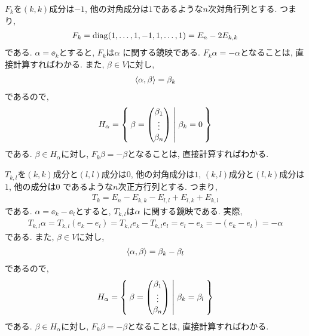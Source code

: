 \begin{example}
  $F_k$を$(k,k)$成分は$-1$, 他の対角成分は$1$であるような$n$次対角行列とする.
つまり,
  \begin{align*}
    F_k = \operatorname{diag}(1,\ldots,1,-1,1,\ldots,1)=E_n-2E_{k,k}
  \end{align*}
  である.
  $\alpha=\ee_k$とすると, $F_k$は$\alpha$ に関する鏡映である.
  $F_k \alpha = -\alpha$となることは, 直接計算すればわかる.
  また, $\beta\in V$に対し,
  \begin{align*}
    \Braket{\alpha,\beta}= \beta_k 
  \end{align*}
  であるので,
  \begin{align*}
    H_\alpha = \Set{
      \beta=
      \begin{pmatrix}
        \beta_1\\
        \vdots\\
        \beta_n
      \end{pmatrix}
      | \beta_k=0}
  \end{align*}
  である.  $\beta\in H_\alpha$に対し, 
  $F_k \beta = -\beta$となることは, 直接計算すればわかる.
\end{example}

\begin{example}
  $T_{k,l}$を$(k,k)$成分と$(l,l)$成分は$0$, 他の対角成分は$1$,
$(k,l)$成分と$(l,k)$成分は$1$, 他の成分は$0$
  であるような$n$次正方行列とする.
  つまり,
  \begin{align*}
    T_k =E_n-E_{k,k}-E_{l,l}+E_{l,k}+E_{k,l}
  \end{align*}
  である.
  $\alpha=\ee_k-\ee_l$とすると, $T_{k,l}$は$\alpha$ に関する鏡映である.
  実際,
  \begin{align*}
    T_{k,l} \alpha = T_{k,l}(e_k-e_l) = T_{k,l}e_k-T_{k,l}e_l = e_l - e_k = -(e_k - e_l) = -\alpha 
  \end{align*}
  である.  
  また, $\beta\in V$に対し,
  \begin{align*}
    \Braket{\alpha,\beta}= \beta_k - \beta_l
  \end{align*}
  であるので,
  \begin{align*}
    H_\alpha = \Set{
      \beta=
      \begin{pmatrix}
        \beta_1\\
        \vdots\\
        \beta_n
      \end{pmatrix}
      | \beta_k=\beta_l}
  \end{align*}
  である.
  $\beta\in H_\alpha$に対し, 
  $F_k \beta = -\beta$となることは, 直接計算すればわかる.
\end{example}



